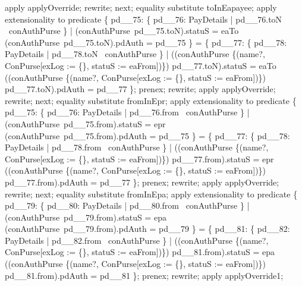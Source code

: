 \begin{LPScript}
\begin{zproof}[lPromotedAuxWorldClearExceptionLogType]
        apply applyOverride;
        rewrite;
    next;
        equality substitute toInEapayee;
        apply extensionality to predicate
            \{ pd\_\_75: \{ pd\_\_76: PayDetails | pd\_\_76.toN \in \dom~conAuthPurse \}
              | (conAuthPurse~pd\_\_75.toN).statuS = eaTo
              \land (conAuthPurse~pd\_\_75.toN).pdAuth = pd\_\_75 \}
            = \{ pd\_\_77: \{ pd\_\_78: PayDetails | pd\_\_78.toN \in \dom~conAuthPurse \}
                | ((conAuthPurse \oplus \{(name?, \theta ConPurse[exLog := \{\},
                    statuS := eaFrom])\}) pd\_\_77.toN).statuS
                = eaTo
                \land ((conAuthPurse \oplus \{(name?, \theta ConPurse[exLog := \{\},
                    statuS := eaFrom])\}) pd\_\_77.toN).pdAuth = pd\_\_77 \};
        prenex;
        rewrite;
        apply applyOverride;
        rewrite;
    next;
        equality substitute fromInEpr;
        apply extensionality to predicate
            \{ pd\_\_75: \{ pd\_\_76: PayDetails | pd\_\_76.from \in \dom~conAuthPurse \}
                | (conAuthPurse~pd\_\_75.from).statuS = epr
                \land (conAuthPurse~pd\_\_75.from).pdAuth = pd\_\_75 \}
            = \{ pd\_\_77: \{ pd\_\_78: PayDetails | pd\_\_78.from \in \dom~conAuthPurse \}
                | ((conAuthPurse \oplus \{(name?, \theta ConPurse[exLog := \{\},
                    statuS := eaFrom])\}) pd\_\_77.from).statuS = epr
             \land ((conAuthPurse \oplus \{(name?, \theta ConPurse[exLog := \{\},
                    statuS := eaFrom])\}) pd\_\_77.from).pdAuth = pd\_\_77 \};
        prenex;
        rewrite;
        apply applyOverride;
        rewrite;
    next;
        equality substitute fromInEpa;
        apply extensionality to predicate
            \{ pd\_\_79: \{ pd\_\_80: PayDetails | pd\_\_80.from \in \dom~conAuthPurse \}
                | (conAuthPurse~pd\_\_79.from).statuS = epa
                \land (conAuthPurse~pd\_\_79.from).pdAuth = pd\_\_79 \}
            = \{ pd\_\_81: \{ pd\_\_82: PayDetails | pd\_\_82.from \in \dom~conAuthPurse \}
                | ((conAuthPurse \oplus \{(name?, \theta ConPurse[exLog := \{\},
                    statuS := eaFrom])\}) pd\_\_81.from).statuS = epa
                \land ((conAuthPurse \oplus \{(name?, \theta ConPurse[exLog := \{\},
                    statuS := eaFrom])\}) pd\_\_81.from).pdAuth = pd\_\_81 \};
        prenex;
        rewrite;
        apply applyOverride1;

\end{zproof}
\end{LPScript}
